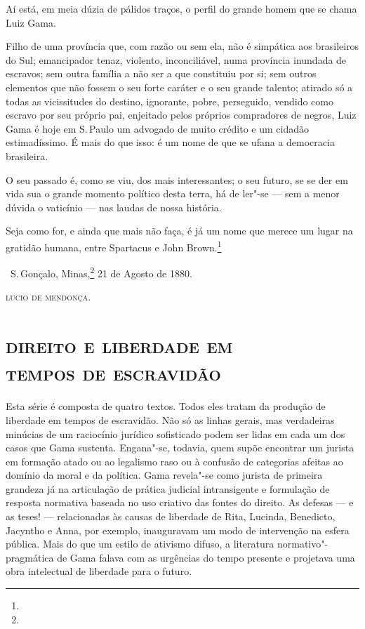 Aí está, em meia dúzia de pálidos traços, o perfil do grande homem que
se chama Luiz Gama.

Filho de uma província que, com razão ou sem ela, não é simpática aos
brasileiros do Sul; emancipador tenaz, violento, inconciliável, numa
província inundada de escravos; sem outra família a não ser a que
constituiu por si; sem outros elementos que não fossem o seu forte
caráter e o seu grande talento; atirado só a todas as vicissitudes do
destino, ignorante, pobre, perseguido, vendido como escravo por seu
próprio pai, enjeitado pelos próprios compradores de negros, Luiz Gama é
hoje em S.\,Paulo um advogado de muito crédito e um cidadão
estimadíssimo. É mais do que isso: é um nome de que se ufana a
democracia brasileira.

O seu passado é, como se viu, dos mais interessantes; o seu futuro, se
se der em vida sua o grande momento político desta terra, há de ler"-se
--- sem a menor dúvida o vaticínio --- nas laudas de nossa história.

Seja como for, e ainda que mais não faça, é já um nome que merece um
lugar na gratidão humana, entre Spartacus e John Brown.\footnote{}

\vfill

\hfill\ S.\,Gonçalo, Minas,\footnote{} 21 de Agosto de 1880.\smallskip

\hfill\textsc{lucio de mendonça.}

\paginabranca
\begingroup\makeatletter\@openrightfalse
\part[direito e liberdade em tempos de escravidão]{\textsc{direito e liberdade em\\ tempos de escravidão}}

\mbox{}\vfill
\thispagestyle{empty}
{\small\noindent
Esta série é composta de quatro textos. Todos eles tratam da
produção de liberdade em tempos de escravidão. Não só as linhas gerais,
mas verdadeiras minúcias de um raciocínio jurídico sofisticado podem ser
lidas em cada um dos casos que Gama sustenta. Engana"-se, todavia, quem
supõe encontrar um jurista em formação atado ou ao legalismo raso ou à
confusão de categorias afeitas ao domínio da moral e da política. Gama
revela"-se como jurista de primeira grandeza já na articulação de prática
judicial intransigente e formulação de resposta normativa baseada no uso
criativo das fontes do direito. As defesas --- e as teses! ---
relacionadas às causas de liberdade de Rita, Lucinda, Benedicto,
Jacyntho e Anna, por exemplo, inauguravam um modo de intervenção na
esfera pública. Mais do que um estilo de ativismo difuso, a literatura
normativo"-pragmática de Gama falava com as urgências do tempo presente e
projetava uma obra intelectual de liberdade para o futuro.}

